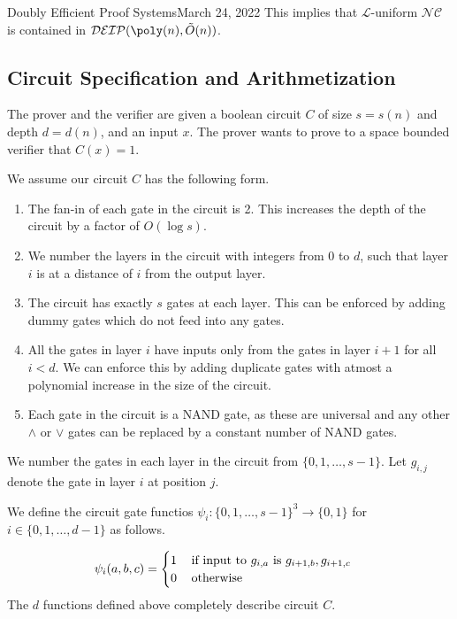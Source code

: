 \begin{lecture}{9}{Doubly Efficient Proof Systems}{March 24, 2022}
This implies that $\mathcal{L}$-uniform $\mathcal{NC}$ is contained in $\mathcal{DEIP}(\poly(n), \tilde{O}(n))$.


\subsection{Circuit Specification and Arithmetization}


The prover and the verifier are given a boolean circuit $C$ of size $s = s(n)$ and depth $d= d(n)$, and an input $x$. The prover wants to prove to a space bounded verifier that $C(x)=1$. 

We assume our circuit $C$ has the following form. 

\begin{enumerate}
	\item The fan-in of each gate in the circuit is 2. This increases the depth of the circuit by a factor of $O(\log s)$.
	\item We number the layers in the circuit with integers from 0 to $d$, such that layer $i$ is at a distance of $i$ from the output layer.
	\item The circuit has exactly $s$ gates at each layer. This can be enforced by adding dummy gates which do not feed into any gates. 
	\item All the gates in layer $i$ have inputs only from the gates in layer $i+1$ for all $i < d$. We can enforce this by adding duplicate gates with atmost a polynomial increase in the size of the circuit.
	\item Each gate in the circuit is a NAND gate, as these are universal and any other $\wedge$ or $\vee$ gates can be replaced by a constant number of NAND gates.
\end{enumerate}

We number the gates in each layer in the circuit from $\{0,1,\ldots, s-1\}$. Let $g_{i,j}$ denote the gate in layer $i$ at position $j$.  

\begin{definition}\label{def:psis}
	We define the circuit gate functios $\psi_i:\{0,1,\ldots, s-1\}^3 \rightarrow \{0,1\}$ for $i \in \{0, 1, \ldots, d-1\}$ as follows. 
	
	\[
	\psi_i(a,b,c) = \begin{cases}
	1  \hspace{3mm}\textrm{   if input to $g_{i,a}$ is $g_{i+1,b}, g_{i+1,c}$} \\
	0 \hspace{3mm}\textrm{   otherwise}
	\end{cases}
	\]
	The $d$ functions defined above completely describe circuit $C$.
\end{definition}




\end{lecture}
